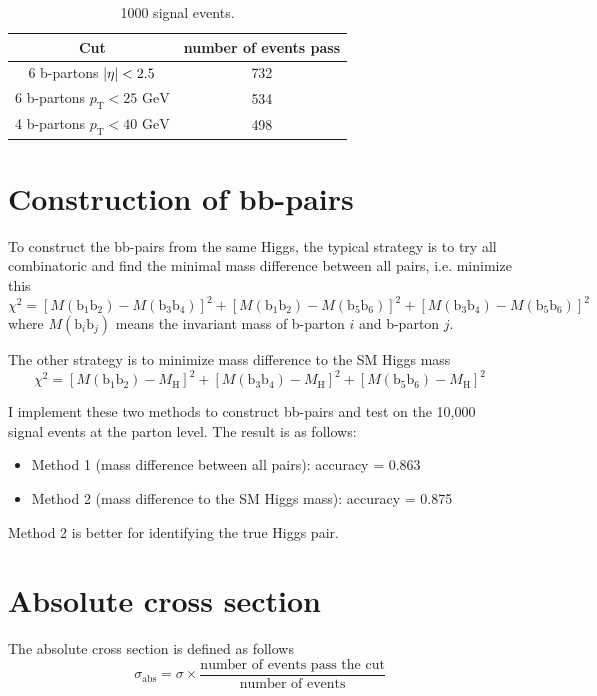 \documentclass[12pt]{article}
\begin{document}
	\begin{table}[htpb]
		\centering
		\caption{1000 signal events.}
		\label{tab:cutflow_table_signal}
		\begin{tabular}{cc}
			Cut & number of events pass \\ 
			\hline
			6 b-partons $\abs{\eta}<2.5$ & 732 \\
			6 b-partons $p_\text{T} < 25 \text{ GeV}$ & 534 \\
			4 b-partons $p_\text{T} < 40 \text{ GeV}$ & 498                            
		\end{tabular}	
	\end{table}

\section{Construction of bb-pairs}%
\label{sec:construction_of_bb_pairs}
	To construct the bb-pairs from the same Higgs, the typical strategy is to try all combinatoric and find the minimal mass difference between all pairs, i.e. minimize this
	\[
		\chi^2 = [M(\text{b}_1\text{b}_2) - M(\text{b}_3 \text{b}_4)]^2 + [M(\text{b}_1\text{b}_2) - M(\text{b}_5 \text{b}_6)]^2 +[M(\text{b}_3\text{b}_4) - M(\text{b}_5 \text{b}_6)]^2
	\] 
	where $M(\text{b}_i \text{b}_j)$ means the invariant mass of b-parton $i$ and b-parton $j$.

	The other strategy is to minimize mass difference to the SM Higgs mass
	\[
		\chi^2 = [M(\text{b}_1\text{b}_2) - M_\text{H}]^2 + [M(\text{b}_3\text{b}_4) - M_\text{H}]^2 +[M(\text{b}_5\text{b}_6) - M_\text{H}]^2
	\] 

	I implement these two methods to construct bb-pairs and test on the 10,000 signal events at the parton level. The result is as follows:
	\begin{itemize}
		\item Method 1 (mass difference between all pairs): accuracy = 0.863
		\item Method 2 (mass difference to the SM Higgs mass): accuracy = 0.875
	\end{itemize}


	Method 2 is better for identifying the true Higgs pair.

\section{Absolute cross section}%
\label{sec:absolute_cross_section}
	The absolute cross section is defined as follows
	\[
		\sigma_\text{abs} = \sigma \times \frac{\text{number of events pass the cut}}{\text{number of events}}
	\] 
\end{document}
